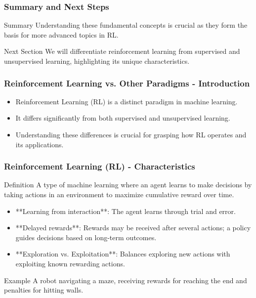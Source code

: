 \documentclass[aspectratio=169]{beamer}
\begin{document}
\begin{frame}[fragile]
    \frametitle{Summary and Next Steps}
    \begin{block}{Summary}
        Understanding these fundamental concepts is crucial as they form the basis for more advanced topics in RL. 
    \end{block}
    
    \begin{block}{Next Section}
        We will differentiate reinforcement learning from supervised and unsupervised learning, highlighting its unique characteristics.
    \end{block}
\end{frame}

\begin{frame}[fragile]
    \frametitle{Reinforcement Learning vs. Other Paradigms - Introduction}
    \begin{itemize}
        \item Reinforcement Learning (RL) is a distinct paradigm in machine learning.
        \item It differs significantly from both supervised and unsupervised learning.
        \item Understanding these differences is crucial for grasping how RL operates and its applications.
    \end{itemize}
\end{frame}

\begin{frame}[fragile]
    \frametitle{Reinforcement Learning (RL) - Characteristics}
    \begin{block}{Definition}
        A type of machine learning where an agent learns to make decisions by taking actions in an environment to maximize cumulative reward over time.
    \end{block}
    \begin{itemize}
        \item **Learning from interaction**: The agent learns through trial and error.
        \item **Delayed rewards**: Rewards may be received after several actions; a policy guides decisions based on long-term outcomes.
        \item **Exploration vs. Exploitation**: Balances exploring new actions with exploiting known rewarding actions.
    \end{itemize}
    \begin{block}{Example}
        A robot navigating a maze, receiving rewards for reaching the end and penalties for hitting walls.
    \end{block}
\end{frame}
\end{document}
